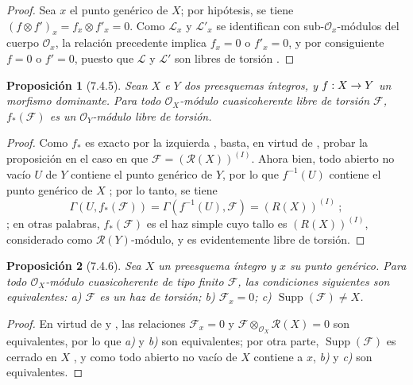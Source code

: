 \documentclass[oneside]{amsart}
\theoremstyle{ega-env-style}
\theoremstyle{ega-thm-env-style}
\newtheorem*{proposition}{Proposición}
\theoremstyle{ega-defn-env-style}
\renewcommand{\to}{\mathchoice{\longrightarrow}{\rightarrow}{\rightarrow}{\rightarrow}}
\newcommand{\oldpage}[2][]{{\marginnote{\normalfont{\textbf{#1}~|~#2}}}\ignorespaces}
\let\EGAOriginalLabel\label
\renewcommand{\label}[1]{\phantomsection\EGAOriginalLabel{#1}}
\begin{document}
\begin{proof}
Sea $x$ el punto genérico de $X$; por hipótesis, se tiene $(f\otimes f')_x=f_x\otimes f'_x=0$.
Como $\mathscr{L}_x$ y $\mathscr{L}'_x$ se identifican con sub-$\mathscr{O}_x$-módulos del cuerpo $\mathscr{O}_x$, la relación precedente implica $f_x=0$ o $f'_x=0$, y por consiguiente $f=0$ o $f'=0$, puesto que $\mathscr{L}$ y $\mathscr{L}'$ son libres de torsión .
\end{proof}

\begin{proposition}[7.4.5]
\label{I.7.4.5}
Sean $X$ e $Y$ dos preesquemas íntegros, y $f:X\to Y$ un morfismo dominante.
Para todo $\mathscr{O}_X$-módulo cuasicoherente libre de torsión $\mathscr{F}$, $f_*(\mathscr{F})$ es un $\mathscr{O}_Y$-módulo libre de torsión.
\end{proposition}

\oldpage[I]{164}
\begin{proof}
Como $f_*$ es exacto por la izquierda , basta, en virtud de , probar la proposición en el caso en que $\mathscr{F}=(\mathscr{R}(X))^{(I)}$.
Ahora bien, todo abierto no vacío $U$ de $Y$ contiene el punto genérico de $Y$, por lo que $f^{-1}(U)$ contiene el punto genérico de $X$ ; por lo tanto, se tiene \[
  \Gamma(U,f_*(\mathscr{F}))
  =\Gamma(f^{-1}(U),\mathscr{F})=(R(X))^{(I)}~;
\]; en otras palabras, $f_*(\mathscr{F})$ es el haz simple cuyo tallo es $(R(X))^{(I)}$, considerado como $\mathscr{R}(Y)$-módulo, y es evidentemente libre de torsión.
\end{proof}

\begin{proposition}[7.4.6]
\label{I.7.4.6}
Sea $X$ un preesquema íntegro y $x$ su punto genérico.
Para todo $\mathscr{O}_X$-módulo cuasicoherente de tipo finito $\mathscr{F}$, las condiciones siguientes son equivalentes: \textup{a)} $\mathscr{F}$ es un haz de torsión; \textup{b)} $\mathscr{F}_x=0$; \textup{c)} $\operatorname{Supp}(\mathscr{F})\neq X$.
\end{proposition}

\begin{proof}
En virtud de  y , las relaciones $\mathscr{F}_x=0$ y $\mathscr{F}\otimes_{\mathscr{O}_X}\mathscr{R}(X)=0$ son equivalentes, por lo que \emph{a)} y \emph{b)} son equivalentes; por otra parte, $\operatorname{Supp}(\mathscr{F})$ es cerrado en $X$ , y como todo abierto no vacío de $X$ contiene a $x$, \emph{b)} y \emph{c)} son equivalentes.
\end{proof}
\end{document}
